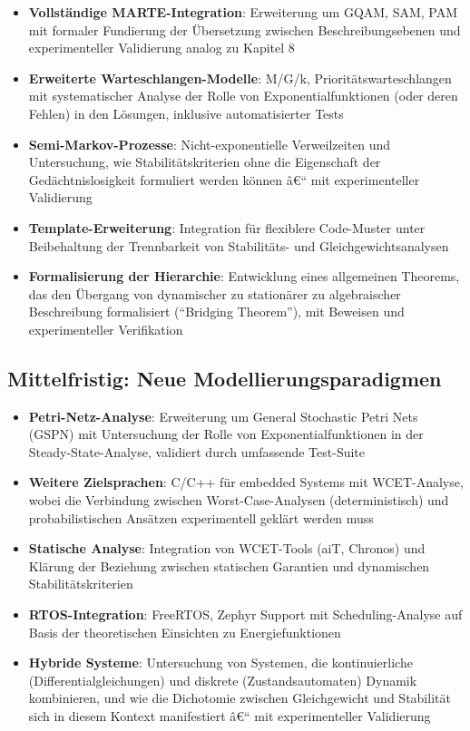 ﻿\documentclass[a4paper,12pt]{report}
\theoremstyle{definition}
\begin{document}
\begin{itemize}
	\item[-] \textbf{Vollständige MARTE-Integration}: Erweiterung um GQAM, SAM, PAM mit formaler Fundierung der Übersetzung zwischen Beschreibungsebenen und experimenteller Validierung analog zu Kapitel 8
	
	\item[-] \textbf{Erweiterte Warteschlangen-Modelle}: M/G/k, Prioritätswarteschlangen mit systematischer Analyse der Rolle von Exponentialfunktionen (oder deren Fehlen) in den Lösungen, inklusive automatisierter Tests
	
	\item[-] \textbf{Semi-Markov-Prozesse}: Nicht-exponentielle Verweilzeiten und Untersuchung, wie Stabilitätskriterien ohne die Eigenschaft der Gedächtnislosigkeit formuliert werden können â€“ mit experimenteller Validierung
	
	\item[-] \textbf{Template-Erweiterung}: Integration für flexiblere Code-Muster unter Beibehaltung der Trennbarkeit von Stabilitäts- und Gleichgewichtsanalysen
	
	\item[-] \textbf{Formalisierung der Hierarchie}: Entwicklung eines allgemeinen Theorems, das den Übergang von dynamischer zu stationärer zu algebraischer Beschreibung formalisiert (``Bridging Theorem''), mit Beweisen und experimenteller Verifikation
\end{itemize}

\subsection{Mittelfristig: Neue Modellierungsparadigmen}

\begin{itemize}
	\item[-] \textbf{Petri-Netz-Analyse}: Erweiterung um General Stochastic Petri Nets (GSPN) mit Untersuchung der Rolle von Exponentialfunktionen in der Steady-State-Analyse, validiert durch umfassende Test-Suite
	
	\item[-] \textbf{Weitere Zielsprachen}: C/C++ für embedded Systems mit WCET-Analyse, wobei die Verbindung zwischen Worst-Case-Analysen (deterministisch) und probabilistischen Ansätzen experimentell geklärt werden muss
	
	\item[-] \textbf{Statische Analyse}: Integration von WCET-Tools (aiT, Chronos) und Klärung der Beziehung zwischen statischen Garantien und dynamischen Stabilitätskriterien
	
	\item[-] \textbf{RTOS-Integration}: FreeRTOS, Zephyr Support mit Scheduling-Analyse auf Basis der theoretischen Einsichten zu Energiefunktionen
	
	\item[-] \textbf{Hybride Systeme}: Untersuchung von Systemen, die kontinuierliche (Differentialgleichungen) und diskrete (Zustandsautomaten) Dynamik kombinieren, und wie die Dichotomie zwischen Gleichgewicht und Stabilität sich in diesem Kontext manifestiert â€“ mit experimenteller Validierung
\end{itemize}
\end{document}

